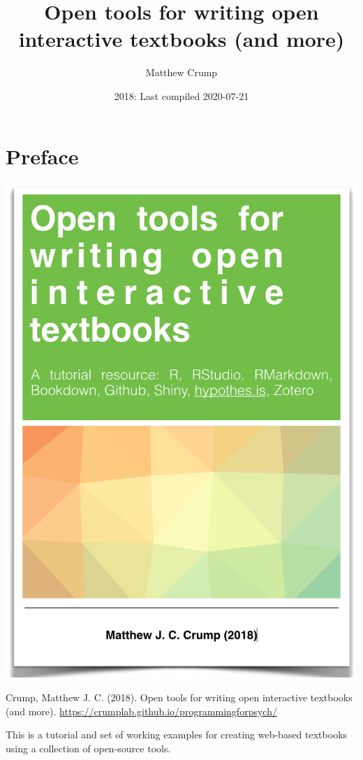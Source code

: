 \documentclass[
]{book}
\title{Open tools for writing open interactive textbooks (and more)}
\author{Matthew Crump}
\date{2018: Last compiled 2020-07-21}
\begin{document}
\maketitle

{
\setcounter{tocdepth}{1}
\tableofcontents
}
\hypertarget{preface}{%
\chapter*{Preface}\label{preface}}

\begin{center}\includegraphics{OER} \end{center}

Crump, Matthew J. C. (2018). Open tools for writing open interactive textbooks (and more). \url{https://crumplab.github.io/programmingforpsych/}

This is a tutorial and set of working examples for creating web-based textbooks using a collection of open-source tools.
\end{document}

